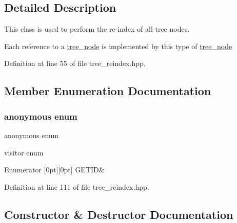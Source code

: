 \subsection{Detailed Description}
This class is used to perform the re-\/index of all tree nodes. 

Each reference to a \hyperlink{classtree__node}{tree\+\_\+node} is implemented by this type of \hyperlink{classtree__node}{tree\+\_\+node} 

Definition at line 55 of file tree\+\_\+reindex.\+hpp.



\subsection{Member Enumeration Documentation}
\mbox{\label{classtree__reindex_ad83affcf938c67e83bb164fcedf11927}} 
\subsubsection{\texorpdfstring{anonymous enum}{anonymous enum}}
{\footnotesize\ttfamily anonymous enum}



visitor enum 

\begin{DoxyEnumFields}{Enumerator}
[0pt][0pt]{}\mbox{\label{classtree__reindex_ad83affcf938c67e83bb164fcedf11927a04780db44061775480bab7b35b4430a1}} 
G\+E\+T\+ID&\\
\hline

\end{DoxyEnumFields}


Definition at line 111 of file tree\+\_\+reindex.\+hpp.



\subsection{Constructor \& Destructor Documentation}
\mbox{\label{classtree__reindex_abdb9b71762bed3ddce4d63a800be428f}} 
